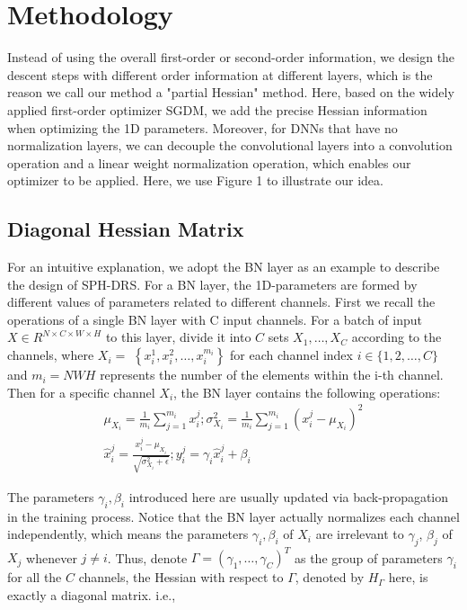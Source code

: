 \documentclass[conference]{IEEEtran}
\begin{document}
\section{Methodology}

Instead of using the overall first-order or second-order information, we design the descent steps with different order information at different layers, which is the reason we call our method a "partial Hessian" method. Here, based on the widely applied first-order optimizer SGDM, we add the precise Hessian information when optimizing the 1D parameters. Moreover, for DNNs that have no normalization layers, we can decouple the convolutional layers into a convolution operation and a linear weight normalization operation, which enables our optimizer to be applied. Here, we use Figure 1 to illustrate our idea.

\subsection{Diagonal Hessian Matrix}

For an intuitive explanation, we adopt the BN layer as an example to describe the design of SPH-DRS. For a BN layer, the 1D-parameters are formed by different values of parameters related to different channels. First we recall the operations of a single BN layer with C input channels. For a batch of input $X \in R^{N \times C \times W \times H}$ to this layer, divide it into $C$ sets $X_{1}, \ldots, X_{C}$ according to the channels, where $X_{i}=$ $\left\{x_{i}^{1}, x_{i}^{2}, \ldots, x_{i}^{m_{i}}\right\}$ for each channel index $i \in\{1,2, \ldots, C\}$ and $m_{i}=N W H$ represents the number of the elements within the i-th channel. Then for a specific channel $X_{i}$, the BN layer contains the following operations:
%
\begin{gather*}
\mu_{X_{i}}=\frac{1}{m_{i}} \sum_{j=1}^{m_{i}} x_{i}^{j} ; \sigma_{X_{i}}^{2}=\frac{1}{m_{i}} \sum_{j=1}^{m_{i}}\left(x_{i}^{j}-\mu_{X_{i}}\right)^{2}  \tag{1}\\
\hat{x}_{i}^{j}=\frac{x_{i}^{j}-\mu_{X_{i}}}{\sqrt{\sigma_{X_{i}}^{2}+\epsilon}} ; y_{i}^{j}=\gamma_{i} \hat{x}_{i}^{j}+\beta_{i} \tag{2}
\end{gather*}

The parameters $\gamma_{i}, \beta_{i}$ introduced here are usually updated via back-propagation in the training process. Notice that the
BN layer actually normalizes each channel independently, which means the parameters $\gamma_{i}, \beta_{i}$ of $X_{i}$ are irrelevant to $\gamma_{j}$, $\beta_{j}$ of $X_{j}$ whenever $j \neq i$. Thus, denote $\Gamma=\left(\gamma_{1}, \ldots, \gamma_{C}\right)^{T}$ as the group of parameters $\gamma_{i}$ for all the $C$ channels, the Hessian with respect to $\Gamma$, denoted by $H_{\Gamma}$ here, is exactly a diagonal matrix. i.e.,
\end{document}
